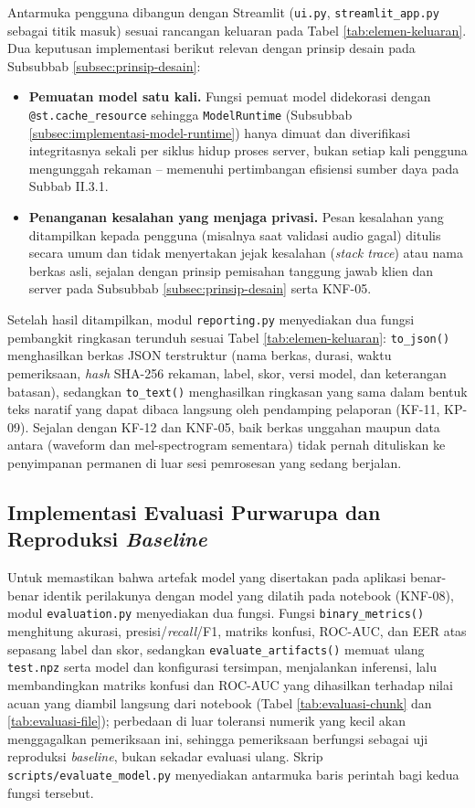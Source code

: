 Antarmuka pengguna dibangun dengan Streamlit (\texttt{ui.py},
\texttt{streamlit\_app.py} sebagai titik masuk) sesuai rancangan keluaran pada
Tabel \ref{tab:elemen-keluaran}. Dua keputusan implementasi berikut relevan
dengan prinsip desain pada Subsubbab \ref{subsec:prinsip-desain}:

\begin{itemize}
  \item \textbf{Pemuatan model satu kali.} Fungsi pemuat model didekorasi dengan
  \texttt{@st.cache\_resource} sehingga \texttt{ModelRuntime} (Subsubbab
  \ref{subsec:implementasi-model-runtime}) hanya dimuat dan diverifikasi
  integritasnya sekali per siklus hidup proses server, bukan setiap kali
  pengguna mengunggah rekaman -- memenuhi pertimbangan efisiensi sumber daya
  pada Subbab II.3.1.
  \item \textbf{Penanganan kesalahan yang menjaga privasi.} Pesan kesalahan yang
  ditampilkan kepada pengguna (misalnya saat validasi audio gagal) ditulis
  secara umum dan tidak menyertakan jejak kesalahan (\textit{stack trace}) atau
  nama berkas asli, sejalan dengan prinsip pemisahan tanggung jawab klien dan
  server pada Subsubbab \ref{subsec:prinsip-desain} serta KNF-05.
\end{itemize}

Setelah hasil ditampilkan, modul \texttt{reporting.py} menyediakan dua fungsi
pembangkit ringkasan terunduh sesuai Tabel \ref{tab:elemen-keluaran}:
\texttt{to\_json()} menghasilkan berkas JSON terstruktur (nama berkas, durasi,
waktu pemeriksaan, \textit{hash} SHA-256 rekaman, label, skor, versi model, dan
keterangan batasan), sedangkan \texttt{to\_text()} menghasilkan ringkasan yang
sama dalam bentuk teks naratif yang dapat dibaca langsung oleh pendamping
pelaporan (KF-11, KP-09). Sejalan dengan KF-12 dan KNF-05, baik berkas unggahan
maupun data antara (waveform dan mel-spectrogram sementara) tidak pernah
dituliskan ke penyimpanan permanen di luar sesi pemrosesan yang sedang
berjalan.

\subsection{Implementasi Evaluasi Purwarupa dan Reproduksi \textit{Baseline}}
\label{subsec:implementasi-evaluasi-app}

Untuk memastikan bahwa artefak model yang disertakan pada aplikasi benar-benar
identik perilakunya dengan model yang dilatih pada notebook (KNF-08), modul
\texttt{evaluation.py} menyediakan dua fungsi. Fungsi \texttt{binary\_metrics()}
menghitung akurasi, presisi/\textit{recall}/F1, matriks konfusi, ROC-AUC, dan
EER atas sepasang label dan skor, sedangkan \texttt{evaluate\_artifacts()}
memuat ulang \texttt{test.npz} serta model dan konfigurasi tersimpan, menjalankan
inferensi, lalu membandingkan matriks konfusi dan ROC-AUC yang dihasilkan
terhadap nilai acuan yang diambil langsung dari notebook (Tabel
\ref{tab:evaluasi-chunk} dan \ref{tab:evaluasi-file}); perbedaan di luar
toleransi numerik yang kecil akan menggagalkan pemeriksaan ini, sehingga
pemeriksaan berfungsi sebagai uji reproduksi \textit{baseline}, bukan sekadar
evaluasi ulang. Skrip \texttt{scripts/evaluate\_model.py} menyediakan antarmuka
baris perintah bagi kedua fungsi tersebut.

